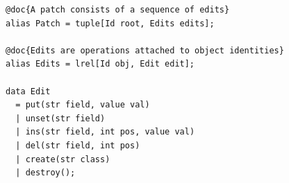 
\begin{lstlisting}[label=lst:delta-adt, caption={CRUD-like patch definition in Rascal.}, language=Rascal, float=tb]
@doc{A patch consists of a sequence of edits}
alias Patch = tuple[Id root, Edits edits];

@doc{Edits are operations attached to object identities}
alias Edits = lrel[Id obj, Edit edit];

data Edit
  = put(str field, value val)
  | unset(str field)
  | ins(str field, int pos, value val)
  | del(str field, int pos)
  | create(str class) 
  | destroy();
\end{lstlisting}

